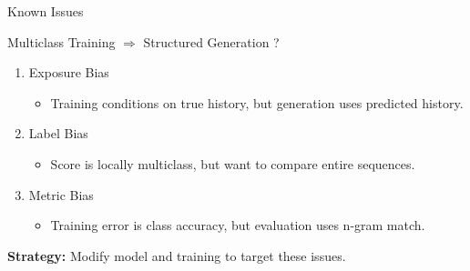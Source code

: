 



\begin{frame}{Known Issues}

  \begin{center}
    Multiclass Training $\Rightarrow$ Structured Generation ?
  \end{center}

  \pause
  \begin{enumerate}
  \item Exposure Bias
    \begin{itemize}
    \item Training conditions on true history, but generation uses predicted history.
    \end{itemize}
    \air
    \pause

  \item Label Bias  %
    \begin{itemize}
    \item Score is locally multiclass, but  want to compare entire sequences.
    \end{itemize}
    \air
    \pause


  \item Metric Bias
    \begin{itemize}
    \item Training error is class accuracy, but evaluation uses n-gram match.
    \end{itemize}
  \end{enumerate}
  \pause
  \begin{center}
    \textbf{Strategy:} Modify model and training to target these issues.
  \end{center}
\end{frame}

